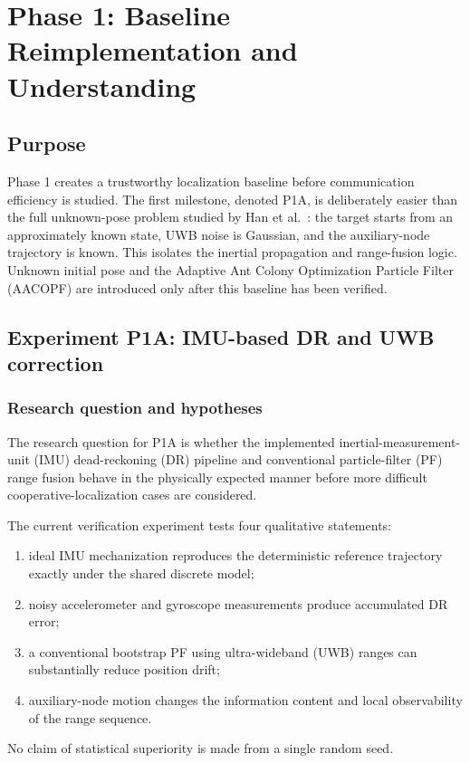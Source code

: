 \chapter{Phase 1: Baseline Reimplementation and Understanding}

\section{Purpose}
Phase 1 creates a trustworthy localization baseline before communication efficiency is studied. The first milestone, denoted P1A, is deliberately easier than the full unknown-pose problem studied by Han et al.~\cite{han2020cooperative}: the target starts from an approximately known state, UWB noise is Gaussian, and the auxiliary-node trajectory is known. This isolates the inertial propagation and range-fusion logic. Unknown initial pose and the Adaptive Ant Colony Optimization Particle Filter (AACOPF) are introduced only after this baseline has been verified.

\section{Experiment P1A: IMU-based DR and UWB correction}
\subsection{Research question and hypotheses}
The research question for P1A is whether the implemented inertial-measurement-unit (IMU) dead-reckoning (DR) pipeline and conventional particle-filter (PF) range fusion behave in the physically expected manner before more difficult cooperative-localization cases are considered.

The current verification experiment tests four qualitative statements:
\begin{enumerate}
    \item ideal IMU mechanization reproduces the deterministic reference trajectory exactly under the shared discrete model;
    \item noisy accelerometer and gyroscope measurements produce accumulated DR error;
    \item a conventional bootstrap PF using ultra-wideband (UWB) ranges can substantially reduce position drift;
    \item auxiliary-node motion changes the information content and local observability of the range sequence.
\end{enumerate}
No claim of statistical superiority is made from a single random seed.

